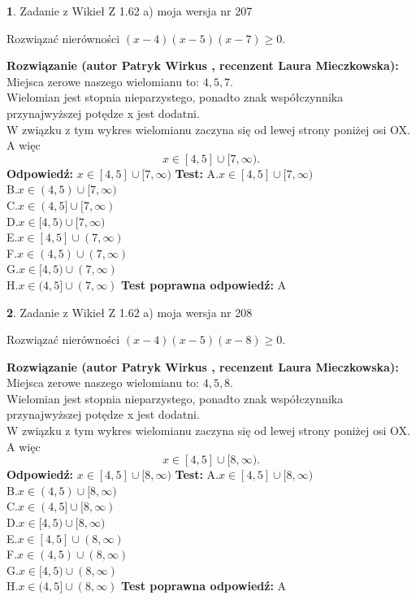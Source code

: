 \documentclass[12pt, a4paper]{article}
\theoremstyle{definition} %
\newtheorem{zad}{}
\newcommand{\zadStart}[1]{\begin{zad}#1\newline}
\newcommand{\zadStop}{\end{zad}}
\newcommand{\rozwStart}[2]{\noindent \textbf{Rozwiązanie (autor #1 , recenzent #2): }\newline}
\newcommand{\rozwStop}{\newline}
\newcommand{\odpStart}{\noindent \textbf{Odpowiedź:}\newline}
\newcommand{\odpStop}{\newline}
\newcommand{\testStart}{\noindent \textbf{Test:}\newline}
\newcommand{\testStop}{\newline}
\newcommand{\kluczStart}{\noindent \textbf{Test poprawna odpowiedź:}\newline}
\newcommand{\kluczStop}{\newline}
\begin{document}
\zadStart{Zadanie z Wikieł Z 1.62 a) moja wersja nr 207}

Rozwiązać nierówności $(x-4)(x-5)(x-7)\ge0$.
\zadStop
\rozwStart{Patryk Wirkus}{Laura Mieczkowska}
Miejsca zerowe naszego wielomianu to: $4, 5, 7$.\\
Wielomian jest stopnia nieparzystego, ponadto znak współczynnika przy\linebreak najwyższej potędze x jest dodatni.\\ W związku z tym wykres wielomianu zaczyna się od lewej strony poniżej osi OX. A więc $$x \in [4,5] \cup [7,\infty).$$
\rozwStop
\odpStart
$x \in [4,5] \cup [7,\infty)$
\odpStop
\testStart
A.$x \in [4,5] \cup [7,\infty)$\\
B.$x \in (4,5) \cup [7,\infty)$\\
C.$x \in (4,5] \cup [7,\infty)$\\
D.$x \in [4,5) \cup [7,\infty)$\\
E.$x \in [4,5] \cup (7,\infty)$\\
F.$x \in (4,5) \cup (7,\infty)$\\
G.$x \in [4,5) \cup (7,\infty)$\\
H.$x \in (4,5] \cup (7,\infty)$
\testStop
\kluczStart
A
\kluczStop



\zadStart{Zadanie z Wikieł Z 1.62 a) moja wersja nr 208}

Rozwiązać nierówności $(x-4)(x-5)(x-8)\ge0$.
\zadStop
\rozwStart{Patryk Wirkus}{Laura Mieczkowska}
Miejsca zerowe naszego wielomianu to: $4, 5, 8$.\\
Wielomian jest stopnia nieparzystego, ponadto znak współczynnika przy\linebreak najwyższej potędze x jest dodatni.\\ W związku z tym wykres wielomianu zaczyna się od lewej strony poniżej osi OX. A więc $$x \in [4,5] \cup [8,\infty).$$
\rozwStop
\odpStart
$x \in [4,5] \cup [8,\infty)$
\odpStop
\testStart
A.$x \in [4,5] \cup [8,\infty)$\\
B.$x \in (4,5) \cup [8,\infty)$\\
C.$x \in (4,5] \cup [8,\infty)$\\
D.$x \in [4,5) \cup [8,\infty)$\\
E.$x \in [4,5] \cup (8,\infty)$\\
F.$x \in (4,5) \cup (8,\infty)$\\
G.$x \in [4,5) \cup (8,\infty)$\\
H.$x \in (4,5] \cup (8,\infty)$
\testStop
\kluczStart
A
\kluczStop
\end{document}
